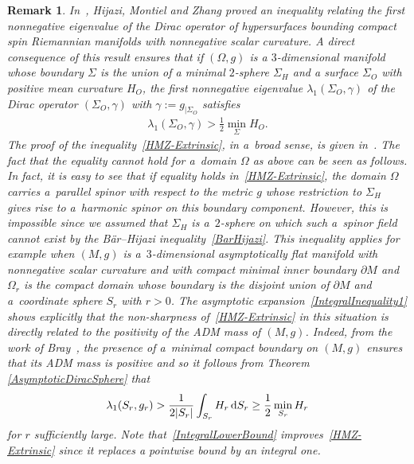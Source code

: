 \documentclass[pdftex]{sigma}
\numberwithin{equation}{section}
\newtheorem{Remark}[Theorem]{Remark}
\begin{document}
\begin{Remark}
In~\cite{HijaziMontielZhang1}, Hijazi, Montiel and Zhang proved an inequality relating the first nonnegative eigenvalue of the Dirac operator of hypersurfaces bounding compact spin Riemannian manifolds with nonnegative scalar curvature. A direct consequence of this result ensures that if $(\Omega,g)$ is a $3$-dimensional manifold whose boundary $\Sigma$ is the union of a minimal $2$-sphere $\Sigma_H$ and a surface $\Sigma_O$ with positive mean curvature $H_O$, the first nonnegative eigenvalue $\lambda_1(\Sigma_O,\gamma)$ of the Dirac operator $(\Sigma_O,\gamma)$ with $\gamma:=g_{|\Sigma_O}$ satisfies
\begin{gather}\label{HMZ-Extrinsic}
\lambda_1(\Sigma_O,\gamma)>\tfrac{1}{2}\min_{\Sigma} H_O.
\end{gather}
The proof of the inequality~\eqref{HMZ-Extrinsic}, in a~broad sense, is given in~\cite[Theorem 6]{HijaziMontielZhang1}. The fact that the equality cannot hold for a~domain $\Omega$ as above can be seen as follows. In fact, it is easy to see that if equality holds in~\eqref{HMZ-Extrinsic}, the domain $\Omega$ carries a~parallel spinor with respect to the metric $g$ whose restriction to $\Sigma_H$ gives rise to a~harmonic spinor on this boundary component. However, this is impossible since we assumed that $\Sigma_H$ is a~$2$-sphere on which such a~spinor field cannot exist by the B\"ar--Hijazi inequality~\eqref{BarHijazi}. This inequality applies for example when $(M,g)$ is a~$3$-dimensional asymptotically flat manifold with nonnegative scalar curvature and with compact minimal inner boundary $\partial M$ and $\Omega_r$ is the compact domain whose boundary is the disjoint union of $\partial M$ and a~coordinate sphere $S_r$ with $r>0$. The asymptotic expansion~\eqref{IntegralInequality1} shows explicitly that the non-sharpness of~\eqref{HMZ-Extrinsic} in this situation is directly related to the positivity of the ADM mass of $(M,g)$. Indeed, from the work of Bray~\cite[Theorem 9]{Bray}, the presence of a~minimal compact boundary on $(M,g)$ ensures that its ADM mass is positive and so it follows from Theorem \ref{AsymptoticDiracSphere} that
\begin{gather}\label{IntegralLowerBound}
\lambda_1(S_r,g_r)>\frac{1}{2|S_r|}\int_{S_r}H_r\,{\rm d}S_r\geq \frac{1}{2}\min_{S_r}H_r
\end{gather}
for $r$ sufficiently large. Note that~\eqref{IntegralLowerBound} improves~\eqref{HMZ-Extrinsic} since it replaces a pointwise bound by an integral one.
\end{Remark}
\end{document}
